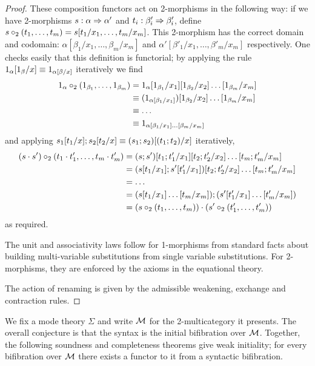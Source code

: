 \begin{proof}
These composition functors act on 2-morphisms in the following way: if we have 2-morphisms $s : \alpha \Rightarrow \alpha'$ and $t_i : \beta_i' \Rightarrow \beta_i'$, define $s \mathbin{\circ_2} (t_1, \dots, t_m) = s[t_1/x_1, \dots, t_m/x_m]$. This 2-morphism has the correct domain and codomain: $\alpha[\beta_1/x_1, \dots, \beta_m / x_m]$ and $\alpha'[\beta'_1/x_1, \dots, \beta'_m / x_m]$ respectively. One checks easily that this definition is functorial; by applying the rule $1_\alpha[1_\beta/x] \equiv 1_{\alpha[\beta/x]}$ iteratively we find
\begin{align*}
1_\alpha \mathbin{\circ_2} (1_{\beta_1}, \dots, 1_{\beta_m}) 
&= 1_\alpha[1_{\beta_1}/x_1][1_{\beta_2}/x_2]\dots[1_{\beta_m}/x_m] \\
&\equiv (1_{\alpha[\beta_1/x_1]})[1_{\beta_2}/x_2]\dots[1_{\beta_m}/x_m] \\
&\equiv \dots \\
&\equiv 1_{\alpha[\beta_1/x_1] \dots [\beta_m / x_m]}
\end{align*}
and applying $s_1[t_1/x];s_2[t_2/x] \equiv (s_1;s_2)[(t_1;t_2)/x]$ iteratively,
\begin{align*}
(s \cdot s') \mathbin{\circ_2} (t_1 \cdot t_1', \dots, t_m \cdot t_m')
&= (s;s')[t_1;t_1'/x_1][t_2;t_2'/x_2]\dots[t_m;t_m'/x_m] \\ 
&= (s[t_1/x_1];s'[t_1'/x_1])[t_2;t_2'/x_2]\dots[t_m;t_m'/x_m] \\
&= \dots \\
&= (s[t_1/x_1]\dots[t_m/x_m]);(s'[t'_1/x_1]\dots[t'_m/x_m]) \\
&= (s \mathbin{\circ_2} (t_1, \dots, t_m)) \cdot (s' \mathbin{\circ_2} (t'_1, \dots, t'_m))
\end{align*}
as required.

The unit and associativity laws follow for 1-morphisms from standard facts about building multi-variable substitutions from single variable substitutions. For 2-morphisms, they are enforced by the axioms in the equational theory.

The action of renaming is given by the admissible weakening, exchange and contraction rules. 
\end{proof}

We fix a mode theory $\Sigma$ and write $\mathcal{M}$ for the 2-multicategory it presents. The overall conjecture is that the syntax is the initial bifibration
over $\mathcal{M}$.  Together, the following soundness and completeness theorems give weak initiality; for every bifibration over $\mathcal{M}$ there exists a functor to it from a syntactic bifibration.


